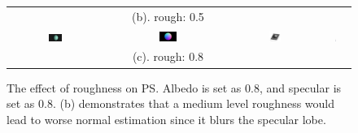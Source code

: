\documentclass{beamer}
\begin{document}
\begin{frame}
\begin{figure}[!htbp]
\begin{tabular}{c|ccc}
  & (b). rough: 0.5\\
  \includegraphics[width=0.15\textwidth]{mapping/ps_spec_rough/0808_0001}&
  \includegraphics[width=0.15\textwidth]{mapping/ps_spec_rough/0808_normal}&
  \includegraphics[width=0.15\textwidth]{images/0808_dmap}&
  \includegraphics[width=0.03\textwidth]{mapping/ps_spec_rough/0808_ang_error}\\
  & (c). rough: 0.8\\
\end{tabular}
\caption{The effect of roughness on PS. Albedo is set as 0.8, and specular is set as 0.8. (b) demonstrates that a medium level roughness would lead to worse normal estimation since it blurs the specular lobe.}
\end{figure}

\end{frame}
\end{document}
